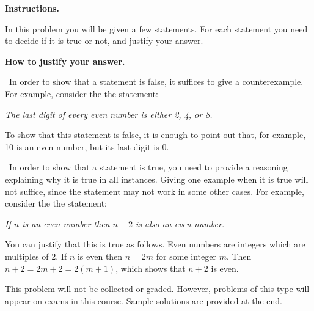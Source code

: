 

\usepackage{multicol}










{\bf Instructions.}

\vskip 2mm

In this problem you will be given a few statements. For each statement you  need to 
decide if it is true or not, and justify your answer. 



\vskip 15mm


{\bf How to justify your answer.}

\vskip 2mm

\textbullet \  In order to show that a statement is false, it suffices  to give a counterexample. 
For example, consider the the statement: 

\begin{center}
\emph{The last digit of every even number is either 2, 4, or 8.}
\end{center}

To show that this statement is false, it is enough to point out that, for example, 10 is an even number, 
but its last digit is 0. 

\vskip 2mm

\textbullet \  In order to show that a statement is true, you need to 
provide a reasoning explaining why it is true in all instances. Giving one example when it is true will 
not suffice, since the statement may not work in some other cases.  For example, consider the the statement: 

\begin{center}
\emph{If $n$ is an even number then $n+2$ is also an even number.}
\end{center}

You can justify that this is true as follows. Even numbers are integers which are multiples of $2$. 
If $n$ is even then $n = 2m$ for some integer $m$. Then $n+2 = 2m+2 = 2(m+1)$, 
which shows that $n+2$ is even.  


\hfill

\begin{cbox}[Note]
This problem will not be collected or graded. However, problems of this type will appear on  exams
in this course. Sample solutions are provided at the end. 

\end{cbox}


